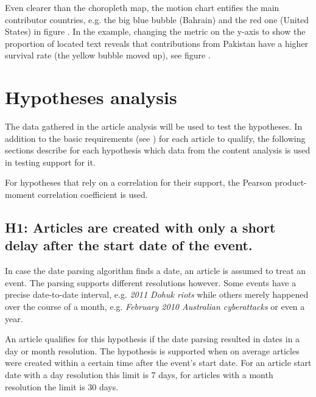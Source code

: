
Even clearer than the choropleth map, the motion chart entifies the main contributor countries, e.g. the big blue bubble (Bahrain) and the red one (United States) in figure .
In the example, changing the metric on the y-axis to show the proportion of located text reveals that contributions from Pakistan have a higher survival rate (the yellow bubble moved up), see figure . 



\section{Hypotheses analysis}\label{hypothesesanalysis}

The data gathered in the article analysis will be used to test the hypotheses.
In addition to the basic requirements (see ) for each article to qualify, the following sections describe for each hypothesis which data from the content analysis is used in testing support for it.

For hypotheses that rely on a correlation for their support, the Pearson product-moment correlation coefficient is used.

\subsection*{H1: Articles are created with only a short delay after the start date of the event.}

In case the date parsing algorithm finds a date, an article is assumed to treat an event.
The parsing supports different resolutions however.
Some events have a precise date-to-date interval, e.g. \emph{2011 Dohuk riots} while others merely happened over the course of a month, e.g. \emph{February 2010 Australian cyberattacks} or even a year.

An article qualifies for this hypothesis if the date parsing resulted in dates in a day or month resolution.
The hypothesis is supported when on average articles were created within a certain time after the event's start date.
For an article start date with a day resolution this limit is 7 days, for articles with a month resolution the limit is 30 days.

